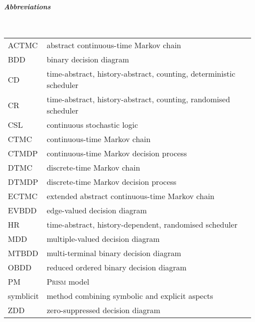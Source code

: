 \documentclass[10pt,twocolumn]{article}
\newcommand{\PRISM}{\textsc{Prism}\xspace}
\begin{document}
\paragraph*{\itshape Abbreviations}\ \\
\begin{supertabular}{p{1.6cm}>{\raggedright\arraybackslash}p{5.7cm}}
ACTMC & abstract continuous-time Markov chain\\
BDD & binary decision diagram\\
CD & time-abstract, history-abstract, counting, deterministic scheduler\\
CR & time-abstract, history-abstract, counting, randomised scheduler\\
CSL & continuous stochastic logic\\
CTMC & continuous-time Markov chain\\
CTMDP & continuous-time Markov decision process\\
DTMC & discrete-time Markov chain\\
DTMDP & discrete-time Markov decision process\\
ECTMC & extended abstract continuous-time Markov chain\\
EVBDD & edge-valued decision diagram\\
HR & time-abstract, history-dependent, randomi\-sed scheduler\\
MDD & multiple-valued decision diagram\\
MTBDD & multi-terminal binary decision diagram\\
OBDD & reduced ordered binary decision diagram\\
PM & \PRISM model\\
symblicit & method combining symbolic and explicit aspects\\
ZDD & zero-suppressed decision diagram\\
\end{supertabular}

\bigskip
\end{document}
